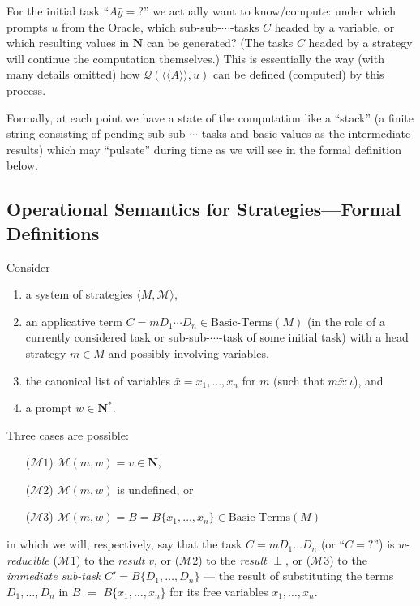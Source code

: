 \documentclass[fleqn]{LMCS}
\theoremstyle{plain}\newtheorem{satz}[thm]{Satz}
\theoremstyle{plain}\newtheorem{hyp}[thm]{Hypothesis}
\theoremstyle{plain}\newtheorem{hyps}[thm]{Hypotheses}
\theoremstyle{definition}\newtheorem{note}[thm]{Note}
\newcommand{\setof}[1]{\{#1\}}
\newcommand{\la}{\langle}
\newcommand{\ra}{\rangle}
\newcommand{\lla}{\langle\!\langle}
\newcommand{\rra}{\rangle\!\rangle}
\newcommand{\Osem}[1]{\lla #1 \rra}
\newcommand{\tuple}[1]{\la #1 \ra}
\newcommand{\NN}{\mathbf{N}}
\newcommand{\Basictype}{\iota}
\newcommand{\Undef}{{\perp}}
\newcommand{\MM}{{\mathcal M}}
\newcommand{\bx}{\bar{x}}
\newcommand{\QQ}{{\mathcal Q}}
\newcommand{\?}{\mbox{?}}
\begin{document}
For the initial task ``$A\bar{y}={?}$'' 
we actually want to know/compute: under which prompts $u$ from the Oracle, which 
sub-sub-$\cdots$-tasks $C$ headed by a variable, 
or which resulting values in $\NN$ can be generated? 
(The tasks $C$ headed by a strategy will continue the computation themselves.)
This is essentially the way (with many details omitted) 
how $\QQ(\Osem{A},u)$ can be defined (computed) 
by this process.

Formally, at each point 
we have a state of the computation 
like a ``stack'' (a finite string 
consisting of pending 
sub-sub-$\cdots$-tasks and basic values as the intermediate results) 
which may ``pulsate'' during time as we will see in the formal 
definition below. 


\subsection{Operational Semantics for Strategies---Formal Definitions}
\label{sec:operational-sem-formal}

\noindent
Consider 
\begin{enumerate}[$\bullet$]
\item
a system of strategies $\tuple{M,\MM}$, 
\item
an applicative term 
$C=mD_1\cdots D_n\in\mbox{Basic-Terms}(M)$ 
(in the role of a currently considered task or sub-sub-$\cdots$-task 
of some initial task) 
with a head strategy $m\in M$ and possibly involving variables. 
\item
the canonical list of variables $\bx=x_1,\ldots,x_n$ for $m$ (such that 
$m\bx:\Basictype$), and 
\item
a prompt $w\in \NN^*$.
\end{enumerate}
Three cases are possible: 
\begin{enumerate}[($\MM$1)]
\item[($\MM1$)]
$\MM(m,w)=v\in \NN$, 
\item[($\MM2$)]
$\MM(m,w)$ is undefined, or 
\item[($\MM3$)]
$\MM(m,w)=B=B\setof{x_1,\ldots,x_n}\in\mbox{Basic-Terms}(M)$ 
\end{enumerate}
in which we will, respectively, say that the task 
$C=mD_1\ldots D_n$ (or ``$C=\?$'') 
is $w$-\emph{reducible} ($\MM1$) to the \emph{result} $v$, 
or 
($\MM2$) to the \emph{result} $\Undef$, 
or
($\MM3$) to 
the \emph{immediate sub-task} 
$C'=B\setof{D_1,\ldots,D_n}$ --- the result of substituting the terms 
$D_1,\ldots,D_n$ in $B$ $=$ 
$B\setof{x_1,\ldots,x_n}$ for 
its free variables $x_1,\ldots,x_n$. 
\end{document}

